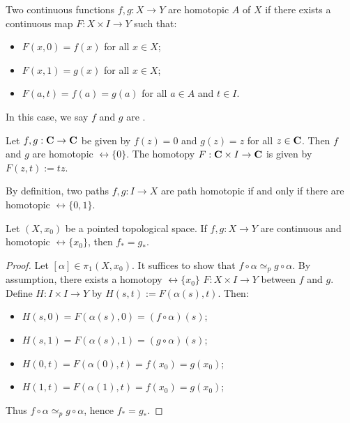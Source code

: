\begin{definition}
Two continuous functions $f,g:X \rightarrow Y$ are homotopic  $A$ of $X$ if there exists a continuous map $F:X \times I \rightarrow Y$ such that:
    \begin{itemize}[itemsep=1pt,topsep=3pt]
        \item $F(x,0) = f(x)$ for all $x \in X$;
        \item $F(x,1) = g(x)$ for all $x \in X$;
        \item $F(a,t) = f(a)=g(a)$ for all $a \in A$ and $t \in I$.
    \end{itemize}
In this case, we say $f$ and $g$ are .
\end{definition}

\begin{example}
    Let $f,g:\mathbf{C} \rightarrow \mathbf{C}$ be given by $f(z) = 0$ and $g(z) = z$ for all $z \in \mathbf{C}$. Then $f$ and $g$ are homotopic $\rel \{0\}$. The homotopy $F:\mathbf{C} \times I \rightarrow \mathbf{C}$ is given by $F(z,t) := tz$.
\end{example}

\begin{example}
    By definition, two paths $f,g:I \rightarrow X$ are path homotopic if and only if there are homotopic $\rel\{0,1\}$.
\end{example}

\begin{proposition}\label{prop:retract-isom}
    Let $(X,x_0)$ be a pointed topological space. If $f,g:X \rightarrow Y$ are continuous and homotopic $\rel\{x_0\}$, then $f_\ast = g_\ast$.
\end{proposition}
    \begin{proof}
        Let $[\alpha] \in \pi_1(X,x_0)$. It suffices to show that $f \circ \alpha \simeq_p g \circ \alpha$. By assumption, there exists a homotopy $\rel\{x_0\}$ $F:X \times I \rightarrow Y$ between $f$ and $g$. Define $H:I \times I \rightarrow Y$ by $H(s,t) := F(\alpha(s),t)$. Then:
        \begin{itemize}[itemsep=1pt,topsep=3pt]
            \item $H(s,0) = F(\alpha(s),0) = (f \circ \alpha)(s)$;
            \item $H(s,1) = F(\alpha(s),1) = (g \circ \alpha)(s)$;
            \item $H(0,t) = F(\alpha(0),t) = f(x_0) = g(x_0)$;
            \item $H(1,t) = F(\alpha(1),t) = f(x_0) = g(x_0)$;
        \end{itemize}
        Thus $f \circ \alpha \simeq_p g \circ \alpha$, hence $f_\ast = g_\ast$.
    \end{proof}

